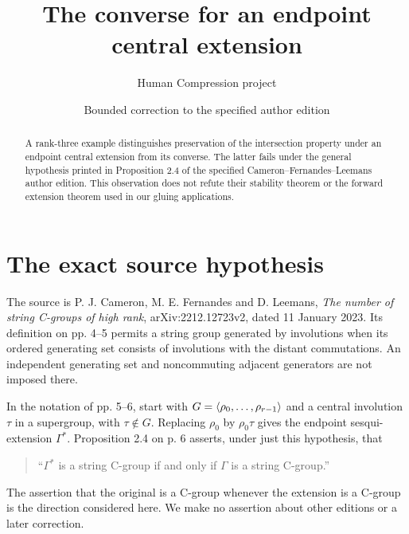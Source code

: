 \documentclass[11pt,a4paper]{article}
\title{The converse for an endpoint central extension}
\author{Human Compression project}\date{Bounded correction to the specified author edition}
\begin{document}
\maketitle
\begin{abstract}
A rank-three example distinguishes preservation of the intersection property under an endpoint central extension from its converse. The latter fails under the general hypothesis printed in Proposition 2.4 of the specified Cameron--Fernandes--Leemans author edition. This observation does not refute their stability theorem or the forward extension theorem used in our gluing applications.
\end{abstract}

\section{The exact source hypothesis}
The source is P. J. Cameron, M. E. Fernandes and D. Leemans, \emph{The number of string C-groups of high rank}, arXiv:2212.12723v2, dated 11 January 2023. Its definition on pp. 4--5 permits a string group generated by involutions when its ordered generating set consists of involutions with the distant commutations. An independent generating set and noncommuting adjacent generators are not imposed there.

In the notation of pp. 5--6, start with $G=\langle\rho_0,\ldots,\rho_{r-1}\rangle$ and a central involution $\tau$ in a supergroup, with $\tau\notin G$. Replacing $\rho_0$ by $\rho_0\tau$ gives the endpoint sesqui-extension $\Gamma^*$. Proposition 2.4 on p. 6 asserts, under just this hypothesis, that
\begin{quote}
``$\Gamma^*$ is a string C-group if and only if $\Gamma$ is a string C-group.''
\end{quote}
The assertion that the original is a C-group whenever the extension is a C-group is the direction considered here. We make no assertion about other editions or a later correction.
\end{document}
